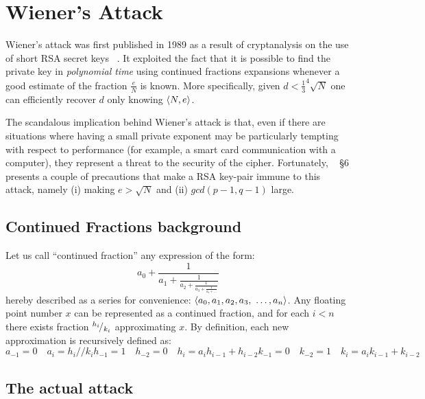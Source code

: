 \chapter{Wiener's Attack \label{chap:wiener}}

Wiener's attack was first published in 1989 as a result of cryptanalysis on the
use of short RSA secret keys ~\cite{wiener}. It exploited the fact that it is
possible to find the private key in \emph{polynomial time} using continued fractions
expansions whenever a good estimate of the fraction $\frac{e}{N}$ is known.
More specifically, given $d < \frac{1}{3} ^{4}\sqrt{N}$ one can efficiently
recover $d$ only knowing $\langle N, e\rangle$.

The scandalous implication behind Wiener's attack is that, even if there are
situations where having a small private exponent may be
particularly tempting with respect to performance (for example, a smart card
communication with a computer), they represent a threat to the security of the
cipher.
Fortunately, ~\cite{wiener} \S 6 presents a couple of precautions that make a
RSA key-pair immune to this attack, namely
(i) making $e > \sqrt{N}$ and
(ii) $gcd(p-1, q-1)$ large.

\section{Continued Fractions background \label{sec:wiener:cf}}

Let us call ``continued fraction'' any expression of the form:
$$
a_0 + \frac{1}{a_1
    + \frac{1}{a_2
    + \frac{1}{a_3
    + \frac{1}{a_4 + \ldots}}}}
$$
hereby described as a series for convenience:
$\angular{a_0, a_1, a_2, a_3,  \ \ldots, a_n}$.
Any floating point number $x$ can be represented as a continued fraction, and
for each $i < n$ there exists fraction $\rfrac{h_i}{k_i}$ approximating $x$.
By definition, each new approximation is recursively defined as:
$$

  a_{-1} = 0 \quad
  a_i = h_i // k_i

  h_{-1} = 1 \quad h_{-2} = 0 \quad
  h_i = a_i h_{i-1} + h_{i-2}

  k_{-1} = 0  \quad k_{-2} = 1 \quad
  k_i = a_i k_{i-1} + k_{i-2}
$$


\section{The actual attack}

